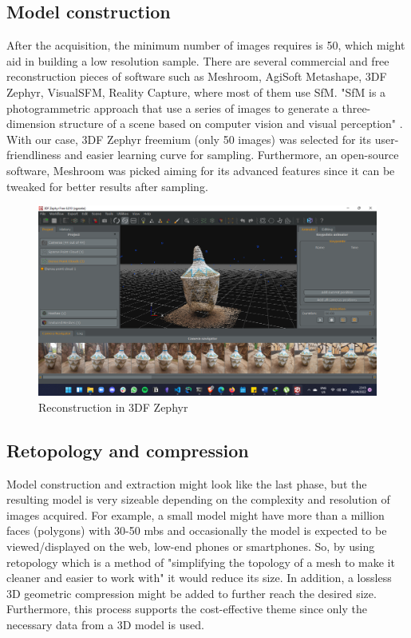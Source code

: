 \documentclass[a4paper, 12pt]{article}
\begin{document}
\subsection{Model construction}
After the acquisition, the minimum number of images requires is 50, which might aid in building a low resolution sample. There are several commercial and free reconstruction pieces of software such as Meshroom, AgiSoft Metashape, 3DF Zephyr, VisualSFM, Reality Capture, where most of them use SfM. "SfM is a photogrammetric approach that use a series of images to generate a three-dimension structure of a scene based on computer vision and visual perception" \cite{Na2022}. With our case, 3DF Zephyr freemium (only 50 images) was selected for its user-friendliness and easier learning curve for sampling. Furthermore, an open-source software, Meshroom was picked aiming for its advanced features since it can be tweaked for better results after sampling.

\begin{figure}[!h]
    \centering
    \includegraphics[width=\linewidth]{images/3df.png}
    \caption{Reconstruction in 3DF Zephyr}
    \label{fig:one}
\end{figure}

\subsection{Retopology and compression}
Model construction and extraction might look like the last phase, but the resulting model is very sizeable depending on the complexity and resolution of images acquired. For example, a small model might have more than a million faces (polygons) with 30-50 mbs \cite{Lauria2022} and occasionally the model is expected to be viewed/displayed on the web, low-end phones or smartphones. So, by using retopology which is a method of "simplifying the topology of a mesh to make it cleaner and easier to work with" \cite{reto} it would reduce its size. In addition, a lossless 3D geometric compression \cite{draco} might be added to further reach the desired size. Furthermore, this process supports the cost-effective theme since only the necessary data from a 3D model is used.
\end{document}
